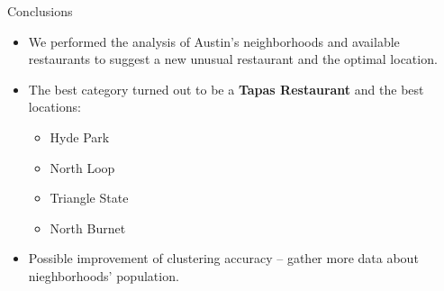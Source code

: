 \documentclass{beamer}
\begin{document}
    \begin{frame}{Conclusions}
 \begin{itemize}
 \item[\EightStarTaper] We performed the analysis of Austin's neighborhoods and available restaurants to suggest a new unusual restaurant and the optimal location.
   \item[\EightStarTaper] The best category turned out to be a {\bf Tapas Restaurant} and the best locations:
   {\bf
   \begin{itemize}
   \item Hyde Park
   \item North Loop
   \item Triangle State
   \item North Burnet
   \end{itemize}
   }
   \item Possible improvement of clustering accuracy -- gather more data about nieghborhoods' population.
      \end{itemize}
  \end{frame}
 
\end{document}
